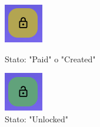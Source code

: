             \begin{figure}[H]
                \centering
                \begin{minipage}{0.45\textwidth}
                    \centering
                    \includegraphics[scale=0.8]{immagini/Transaction/Locked.png} 
                    \caption{Stato: "Paid" o "Created"}
                \end{minipage}\hfill
                \begin{minipage}{0.45\textwidth}
                    \centering
                    \includegraphics[scale=0.8]{immagini/Transaction/Unlocked.png} 
                    \caption{Stato: "Unlocked"}
                \end{minipage}
            \end{figure}